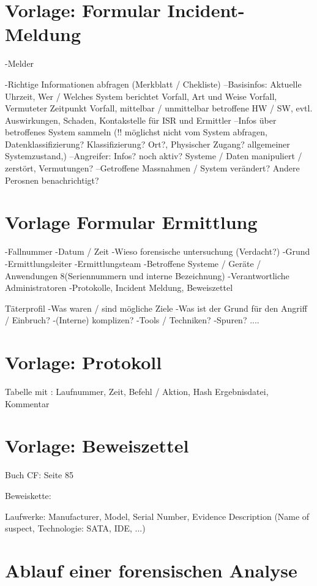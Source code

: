 
%



\chapter{Vorlage: Formular Incident-Meldung} \label{appx:Template:IncidentMessage}
-Melder

-Richtige Informationen abfragen (Merkblatt / Chekliste)
--Basisinfos: Aktuelle Uhrzeit, Wer / Welches System berichtet Vorfall, Art und Weise Vorfall, Vermuteter Zeitpunkt Vorfall, mittelbar / unmittelbar betroffene HW / SW, evtl. Auswirkungen, Schaden, Kontakstelle für ISR und Ermittler
--Infos über betroffenes System sammeln (!! möglichst nicht vom System abfragen, Datenklassifizierung? Klassifizierung? Ort?, Physischer Zugang?  allgemeiner Systemzustand,)
--Angreifer: Infos? noch aktiv? Systeme / Daten manipuliert / zerstört, Vermutungen?
--Getroffene Massnahmen / System verändert? Andere Perosnen benachrichtigt?

\chapter{Vorlage Formular Ermittlung}
-Fallnummer
-Datum / Zeit
-Wieso forensische untersuchung (Verdacht?)
-Grund
-Ermittlungsleiter
-Ermittlungsteam
-Betroffene Systeme / Geräte / Anwendungen 8(Seriennummern und interne Bezeichnung)
-Verantwortliche Administratoren
-Protokolle, Incident Meldung, Beweiszettel

Täterprofil
-Was waren / sind mögliche Ziele
-Was ist der Grund für den Angriff / Einbruch?
-(Interne) komplizen?
-Tools / Techniken?
-Spuren?
....
\chapter{Vorlage: Protokoll}


Tabelle mit : Laufnummer, Zeit, Befehl / Aktion, Hash Ergebnisdatei, Kommentar


\chapter{Vorlage: Beweiszettel}
Buch CF: Seite 85

Beweiskette:

Laufwerke: Manufacturer, Model, Serial Number, Evidence Description (Name of suspect, Technologie: SATA, IDE, ...)





\chapter{Ablauf einer forensischen Analyse}
